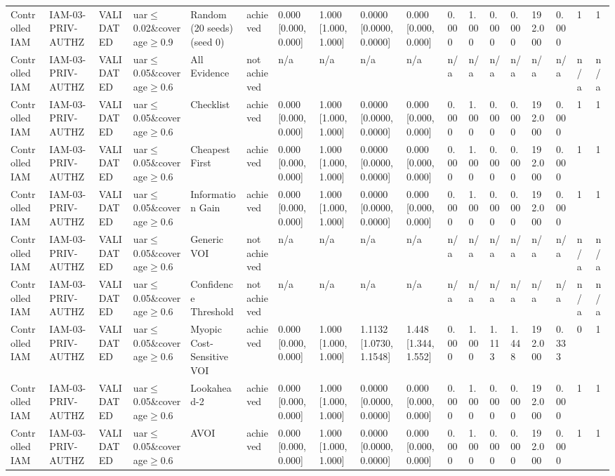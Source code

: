 \begin{table}[!ht]
{\begin{tabular}{llllllllllllllllll}
Controlled IAM & IAM-03-PRIV-AUTHZ & VALIDATED & uar$\le$0.02\&coverage$\ge$0.9 & Random (20 seeds) (seed 0) & achieved & 0.000 [0.000, 0.000] & 1.000 [1.000, 1.000] & 0.0000 [0.0000, 0.0000] & 0.000 [0.000, 0.000] & 0.000 & 1.000 & 0.000 & 0.000 & 192.000 & 0.000 & 1 & 1 \\
Controlled IAM & IAM-03-PRIV-AUTHZ & VALIDATED & uar$\le$0.05\&coverage$\ge$0.6 & All Evidence & not achieved & n/a & n/a & n/a & n/a & n/a & n/a & n/a & n/a & n/a & n/a & n/a & n/a \\
Controlled IAM & IAM-03-PRIV-AUTHZ & VALIDATED & uar$\le$0.05\&coverage$\ge$0.6 & Checklist & achieved & 0.000 [0.000, 0.000] & 1.000 [1.000, 1.000] & 0.0000 [0.0000, 0.0000] & 0.000 [0.000, 0.000] & 0.000 & 1.000 & 0.000 & 0.000 & 192.000 & 0.000 & 1 & 1 \\
Controlled IAM & IAM-03-PRIV-AUTHZ & VALIDATED & uar$\le$0.05\&coverage$\ge$0.6 & Cheapest First & achieved & 0.000 [0.000, 0.000] & 1.000 [1.000, 1.000] & 0.0000 [0.0000, 0.0000] & 0.000 [0.000, 0.000] & 0.000 & 1.000 & 0.000 & 0.000 & 192.000 & 0.000 & 1 & 1 \\
Controlled IAM & IAM-03-PRIV-AUTHZ & VALIDATED & uar$\le$0.05\&coverage$\ge$0.6 & Information Gain & achieved & 0.000 [0.000, 0.000] & 1.000 [1.000, 1.000] & 0.0000 [0.0000, 0.0000] & 0.000 [0.000, 0.000] & 0.000 & 1.000 & 0.000 & 0.000 & 192.000 & 0.000 & 1 & 1 \\
Controlled IAM & IAM-03-PRIV-AUTHZ & VALIDATED & uar$\le$0.05\&coverage$\ge$0.6 & Generic VOI & not achieved & n/a & n/a & n/a & n/a & n/a & n/a & n/a & n/a & n/a & n/a & n/a & n/a \\
Controlled IAM & IAM-03-PRIV-AUTHZ & VALIDATED & uar$\le$0.05\&coverage$\ge$0.6 & Confidence Threshold & not achieved & n/a & n/a & n/a & n/a & n/a & n/a & n/a & n/a & n/a & n/a & n/a & n/a \\
Controlled IAM & IAM-03-PRIV-AUTHZ & VALIDATED & uar$\le$0.05\&coverage$\ge$0.6 & Myopic Cost-Sensitive VOI & achieved & 0.000 [0.000, 0.000] & 1.000 [1.000, 1.000] & 1.1132 [1.0730, 1.1548] & 1.448 [1.344, 1.552] & 0.000 & 1.000 & 1.113 & 1.448 & 192.000 & 0.333 & 0 & 1 \\
Controlled IAM & IAM-03-PRIV-AUTHZ & VALIDATED & uar$\le$0.05\&coverage$\ge$0.6 & Lookahead-2 & achieved & 0.000 [0.000, 0.000] & 1.000 [1.000, 1.000] & 0.0000 [0.0000, 0.0000] & 0.000 [0.000, 0.000] & 0.000 & 1.000 & 0.000 & 0.000 & 192.000 & 0.000 & 1 & 1 \\
Controlled IAM & IAM-03-PRIV-AUTHZ & VALIDATED & uar$\le$0.05\&coverage$\ge$0.6 & AVOI & achieved & 0.000 [0.000, 0.000] & 1.000 [1.000, 1.000] & 0.0000 [0.0000, 0.0000] & 0.000 [0.000, 0.000] & 0.000 & 1.000 & 0.000 & 0.000 & 192.000 & 0.000 & 1 & 1 \\

\end{tabular}}
\end{table}
